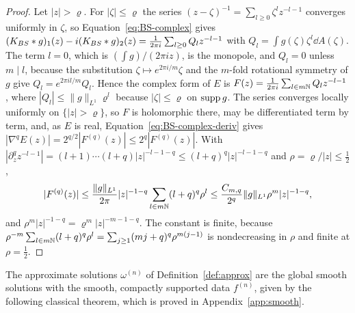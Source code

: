 \begin{proof}
Let $|z|>\varrho$. For $|\zeta|\le\varrho$ the series
$(z-\zeta)^{-1}=\sum_{l\ge0}\zeta^lz^{-l-1}$ converges uniformly in $\zeta$, so
Equation~\eqref{eq:BS-complex} gives
$(K_{BS}\ast g)_1(z)-i(K_{BS}\ast g)_2(z)=\frac1{2\pi i}\sum_{l\ge0}Q_lz^{-l-1}$ with
$Q_l=\int g(\zeta)\zeta^l\dd A(\zeta)$. The term $l=0$, which is $(\int g)/(2\pi iz)$, is the
monopole, and $Q_l=0$ unless $m\mid l$, because the substitution $\zeta\mapsto
e^{2\pi i/m}\zeta$ and the $m$-fold rotational symmetry of $g$ give $Q_l=e^{2\pi il/m}Q_l$. Hence the complex form of $E$ is
$F(z)=\frac1{2\pi i}\sum_{l\in m\mathbb{N}}Q_lz^{-l-1}$, where
$|Q_l|\le\|g\|_{L^1}\varrho^l$ because $|\zeta|\le\varrho$ on $\operatorname{supp} g$. The series converges locally uniformly on
$\{|z|>\varrho\}$, so $F$ is holomorphic there, may be differentiated term by
term, and, as $E$ is real,
Equation~\eqref{eq:BS-complex-deriv} gives
$|\nabla^qE(z)|=2^{q/2}|F^{(q)}(z)|\le2^q|F^{(q)}(z)|$. With
$|\partial_z^qz^{-l-1}|=(l+1)\cdots(l+q)|z|^{-l-1-q}\le(l+q)^q|z|^{-l-1-q}$ and
$\rho=\varrho/|z|\le\frac12$,
\[
|F^{(q)}(z)|\le\frac{\|g\|_{L^1}}{2\pi}|z|^{-1-q}\sum_{l\in m\mathbb{N}}(l+q)^q\rho^l
\le\frac{C_{m,q}}{2^q}\|g\|_{L^1}\rho^m|z|^{-1-q},
\]
and $\rho^m|z|^{-1-q}=\varrho^m|z|^{-m-1-q}$. The constant is finite, because
$\rho^{-m}\sum_{l\in m\mathbb{N}}(l+q)^q\rho^l=\sum_{j\ge1}(mj+q)^q\rho^{m(j-1)}$ is
nondecreasing in $\rho$ and finite at $\rho=\frac12$.
\end{proof}

The approximate solutions $\omega^{(n)}$ of Definition~\ref{def:approx} are the
global smooth solutions with the smooth, compactly supported data $f^{(n)}$,
given by the following classical theorem, which is proved in
Appendix~\ref{app:smooth}.

